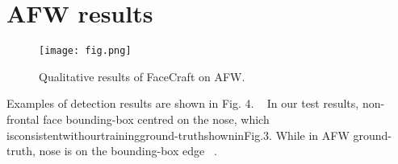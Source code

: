 \documentclass[10pt,twocolumn,letterpaper]{article}
\begin{document}
\section{AFW results}
\begin{figure}[H]
\begin{center}
   \texttt{[image: fig.png]}
\end{center}
   \caption{Qualitative results of FaceCraft on AFW.}
\label{fig:long}
\label{fig:onecol}
\end{figure}
 Examples of detection results are shown in Fig. 4. ~\cite{Alpher03} In our test results, non-frontal face bounding-box centred on the nose, which isconsistentwithourtrainingground-truthshowninFig.3. While in AFW ground-truth, nose is on the bounding-box edge ~\cite{Alpher02}. 





\iffalse
\section{Final copy}

You must include your signed IEEE copyright release form when you submit
your finished paper. We MUST have this form before your paper can be
published in the proceedings.

Please direct any questions to the production editor in charge of these
proceedings at the IEEE Computer Society Press: Phone (714) 821-8380, or
Fax (714) 761-1784.

\fi
\end{document}
